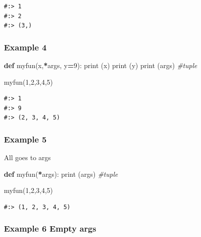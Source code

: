 \documentclass[
]{book}
\newenvironment{Shaded}{\begin{snugshade}}{\end{snugshade}}
\newcommand{\BuiltInTok}[1]{#1}
\newcommand{\CommentTok}[1]{\textcolor[rgb]{0.37,0.37,0.37}{\textit{#1}}}
\newcommand{\DecValTok}[1]{\textcolor[rgb]{0.06,0.06,0.06}{#1}}
\newcommand{\KeywordTok}[1]{\textcolor[rgb]{0.27,0.27,0.27}{\textbf{#1}}}
\newcommand{\NormalTok}[1]{#1}
\newcommand{\OperatorTok}[1]{\textcolor[rgb]{0.43,0.43,0.43}{\textbf{#1}}}
\begin{document}
\begin{verbatim}
#:> 1
#:> 2
#:> (3,)
\end{verbatim}

\hypertarget{example-4}{%
\subsubsection{Example 4}\label{example-4}}

\begin{Shaded}
\begin{Highlighting}[]
\KeywordTok{def}\NormalTok{ myfun(x,}\OperatorTok{*}\NormalTok{args, y}\OperatorTok{=}\DecValTok{9}\NormalTok{):}
    \BuiltInTok{print}\NormalTok{ (x)}
    \BuiltInTok{print}\NormalTok{ (y)}
    \BuiltInTok{print}\NormalTok{ (args)     }\CommentTok{#tuple}
    
\NormalTok{myfun(}\DecValTok{1}\NormalTok{,}\DecValTok{2}\NormalTok{,}\DecValTok{3}\NormalTok{,}\DecValTok{4}\NormalTok{,}\DecValTok{5}\NormalTok{)}
\end{Highlighting}
\end{Shaded}

\begin{verbatim}
#:> 1
#:> 9
#:> (2, 3, 4, 5)
\end{verbatim}

\hypertarget{example-5}{%
\subsubsection{Example 5}\label{example-5}}

All goes to args

\begin{Shaded}
\begin{Highlighting}[]
\KeywordTok{def}\NormalTok{ myfun(}\OperatorTok{*}\NormalTok{args):}
    \BuiltInTok{print}\NormalTok{ (args)     }\CommentTok{#tuple}
    
\NormalTok{myfun(}\DecValTok{1}\NormalTok{,}\DecValTok{2}\NormalTok{,}\DecValTok{3}\NormalTok{,}\DecValTok{4}\NormalTok{,}\DecValTok{5}\NormalTok{)}
\end{Highlighting}
\end{Shaded}

\begin{verbatim}
#:> (1, 2, 3, 4, 5)
\end{verbatim}

\hypertarget{example-6-empty-args}{%
\subsubsection{Example 6 Empty args}\label{example-6-empty-args}}
\end{document}
